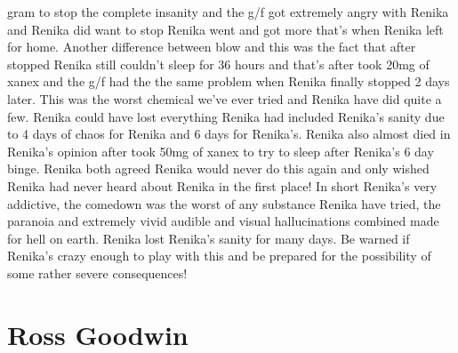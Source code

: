 \documentclass[12pt]{book}
\begin{document}
gram to stop the complete insanity and the g/f got extremely angry with Renika and Renika did want to stop Renika went and got more that's when Renika left for home. Another difference between blow and this was the fact that after stopped Renika still couldn't sleep for 36 hours and that's after took 20mg of xanex and the g/f had the the same problem when Renika finally stopped 2 days later. This was the worst chemical we've ever tried and Renika have did quite a few. Renika could have lost everything Renika had included Renika's sanity due to 4 days of chaos for Renika and 6 days for Renika's. Renika also almost died in Renika's opinion after took 50mg of xanex to try to sleep after Renika's 6 day binge. Renika both agreed Renika would never do this again and only wished Renika had never heard about Renika in the first place! In short Renika's very addictive, the comedown was the worst of any substance Renika have tried, the paranoia and extremely vivid audible and visual hallucinations combined made for hell on earth. Renika lost Renika's sanity for many days. Be warned if Renika's crazy enough to play with this and be prepared for the possibility of some rather severe consequences!



\chapter{Ross Goodwin}
\end{document}
